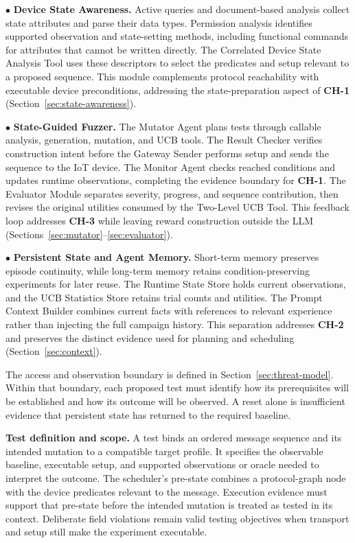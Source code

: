 \documentclass[10pt,journal,compsoc]{IEEEtran}
\newcommand{\parab}[1]{\vspace{0.04in}\noindent\textbf{#1}}
\begin{document}
\noindent $\bullet$ \textbf{Device State Awareness.}
Active queries and document-based analysis collect state attributes and parse their data types. Permission analysis identifies supported observation and state-setting methods, including functional commands for attributes that cannot be written directly. The Correlated Device State Analysis Tool uses these descriptors to select the predicates and setup relevant to a proposed sequence. This module complements protocol reachability with executable device preconditions, addressing the state-preparation aspect of \textbf{CH-1} (Section~\ref{sec:state-awareness}).

\noindent $\bullet$ \textbf{State-Guided Fuzzer.}
The Mutator Agent plans tests through callable analysis, generation, mutation, and UCB tools. The Result Checker verifies construction intent before the Gateway Sender performs setup and sends the sequence to the IoT device. The Monitor Agent checks reached conditions and updates runtime observations, completing the evidence boundary for \textbf{CH-1}. The Evaluator Module separates severity, progress, and sequence contribution, then revises the original utilities consumed by the Two-Level UCB Tool. This feedback loop addresses \textbf{CH-3} while leaving reward construction outside the LLM (Sections~\ref{sec:mutator}--\ref{sec:evaluator}).

\noindent $\bullet$ \textbf{Persistent State and Agent Memory.}
Short-term memory preserves episode continuity, while long-term memory retains condition-preserving experiments for later reuse. The Runtime State Store holds current observations, and the UCB Statistics Store retains trial counts and utilities. The Prompt Context Builder combines current facts with references to relevant experience rather than injecting the full campaign history. This separation addresses \textbf{CH-2} and preserves the distinct evidence used for planning and scheduling (Section~\ref{sec:context}).

The access and observation boundary is defined in Section~\ref{sec:threat-model}. Within that boundary, each proposed test must identify how its prerequisites will be established and how its outcome will be observed. A reset alone is insufficient evidence that persistent state has returned to the required baseline.

\parab{Test definition and scope.}
A test binds an ordered message sequence and its intended mutation to a compatible target profile. It specifies the observable baseline, executable setup, and supported observations or oracle needed to interpret the outcome. The scheduler's pre-state combines a protocol-graph node with the device predicates relevant to the message. Execution evidence must support that pre-state before the intended mutation is treated as tested in its context. Deliberate field violations remain valid testing objectives when transport and setup still make the experiment executable.
\end{document}
